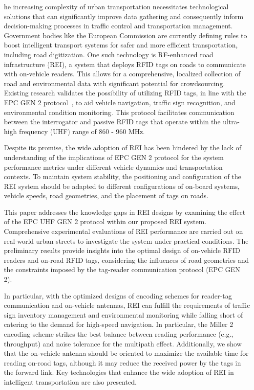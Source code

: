 \documentclass[lettersize,journal]{IEEEtran}
\begin{document}
he increasing complexity of urban transportation necessitates technological solutions that can significantly improve data gathering and consequently inform decision-making processes in traffic control and transportation management. Government bodies like the European Commission are currently defining rules to boost intelligent transport systems for safer and more efficient transportation, including road digitization. One such technology is RF-enhanced road infrastructure (REI), a system that deploys RFID tags on roads to communicate with on-vehicle readers. This allows for a comprehensive, localized collection of road and environmental data with significant potential for crowdsourcing. Existing research validates the possibility of utilizing RFID tags, in line with the EPC GEN 2 protocol~\cite{epcglobal2013epc}, to aid vehicle navigation, traffic sign recognition, and environmental condition monitoring. This protocol facilitates communication between the interrogator and passive RFID tags that operate within the ultra-high frequency (UHF) range of 860 - 960 MHz.

Despite its promise, the wide adoption of REI has been hindered by the lack of understanding of the implications of EPC GEN 2 protocol for the system performance metrics under different vehicle dynamics and transportation contexts. To maintain system stability, the positioning and configuration of the REI system should be adapted to different configurations of on-board systems, vehicle speeds, road geometries, and the placement of tags on roads.

This paper addresses the knowledge gaps in REI designs by examining the effect of the EPC UHF GEN 2 protocol within our proposed REI system. Comprehensive experimental evaluations of REI performance are carried out on real-world urban streets to investigate the system under practical conditions. The preliminary results provide insights into the optimal design of on-vehicle RFID readers and on-road RFID tags, considering the influences of road geometries and the constraints imposed by the tag-reader communication protocol (EPC GEN 2). 

In particular, with the optimized designs of encoding schemes for reader-tag communication and on-vehicle antennas, REI can fulfill the requirements of traffic sign inventory management and environmental monitoring while falling short of catering to the demand for high-speed navigation. In particular, the Miller 2 encoding scheme strikes the best balance between reading performance (e.g., throughput) and noise tolerance for the multipath effect. Additionally, we show that the on-vehicle antenna should be oriented to maximize the available time for reading on-road tags, although it may reduce the received power by the tags in the forward link. Key technologies that enhance the wide adoption of REI in intelligent transportation are also presented.
\end{document}
